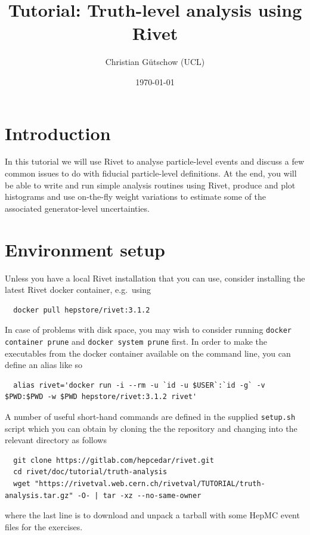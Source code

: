 \documentclass[10pt,fleqn]{scrartcl}
\theoremstyle{exstyle}
\begin{document}
\title{\vspace*{-2em} Tutorial: Truth-level analysis using Rivet}
\author{Christian G\"{u}tschow (UCL)}
\date{\monthyeardate\today}
\maketitle

\section{Introduction}

In this tutorial we will use Rivet to analyse particle-level events 
and discuss a few common issues to do with fiducial particle-level definitions.
At the end, you will be able to write and run simple analysis routines using
Rivet, produce and plot histograms and use on-the-fly weight variations to
estimate some of the associated generator-level uncertainties.

\section{Environment setup}

Unless you have a local Rivet installation that you can use, consider installing the latest Rivet docker container, e.g.\ using
\begin{verbatim}
  docker pull hepstore/rivet:3.1.2
\end{verbatim}
In case of problems with disk space, you may wish to consider running
{\texttt{docker container prune}} and {\texttt{docker system prune}} first.
In order to make the executables from the docker container available on
the command line, you can define an alias like so
\begin{footnotesize}
\begin{verbatim}
  alias rivet='docker run -i --rm -u `id -u $USER`:`id -g` -v $PWD:$PWD -w $PWD hepstore/rivet:3.1.2 rivet'
\end{verbatim}
\end{footnotesize}
\noindent A number of useful short-hand commands are defined in the supplied \texttt{setup.sh} script
which you can obtain by cloning the the repository and changing into the relevant directory as follows
\begin{footnotesize}
\begin{verbatim}
  git clone https://gitlab.com/hepcedar/rivet.git
  cd rivet/doc/tutorial/truth-analysis
  wget "https://rivetval.web.cern.ch/rivetval/TUTORIAL/truth-analysis.tar.gz" -O- | tar -xz --no-same-owner
\end{verbatim}
\end{footnotesize}
where the last line is to download and unpack a tarball with some HepMC event files for the exercises.
\end{document}
